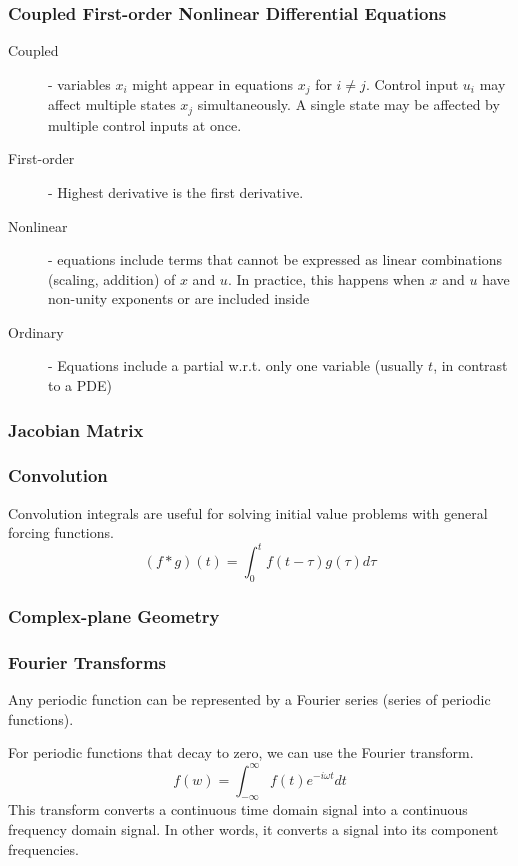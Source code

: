 \documentclass[../notes.tex]{subfiles}
\begin{document}
\subsubsection{Coupled First-order Nonlinear Differential Equations} \label{sec:coupled_diff_eq}
\begin{description}
    \item[Coupled] - variables $x_i$ might appear in equations $x_j$ for $i \neq j$. Control input $u_i$ may affect multiple states $x_j$ simultaneously. A single state may be affected by multiple control inputs at once.
    \item[First-order] - Highest derivative is the first derivative.
    \item[Nonlinear] - equations include terms that cannot be expressed as linear combinations (scaling, addition) of $x$ and $u$. In practice, this happens when $x$ and $u$ have non-unity exponents or are included inside
    \item[Ordinary] - Equations include a partial w.r.t. only one variable (usually $t$, in contrast to a PDE)    
\end{description}

\subsubsection{Jacobian Matrix} \label{sec:jacobian}

\subsubsection{Convolution}
Convolution integrals are useful for solving initial value problems with general forcing functions.
\begin{equation}
    (f * g)(t) = \int_{0}^{t} f(t-\tau)g(\tau)d\tau
\end{equation}

\subsubsection{Complex-plane Geometry}

\subsubsection{Fourier Transforms}
Any periodic function can be represented by a Fourier series (series of periodic functions).

For periodic functions that decay to zero, we can use the Fourier transform.
\begin{equation}
    f(w) = \int_{-\infty}^{\infty}f(t)e^{-i\omega t}dt
\end{equation}
This transform converts a continuous time domain signal into a continuous frequency domain signal. In other words, it converts a signal into its component frequencies.
\end{document}
